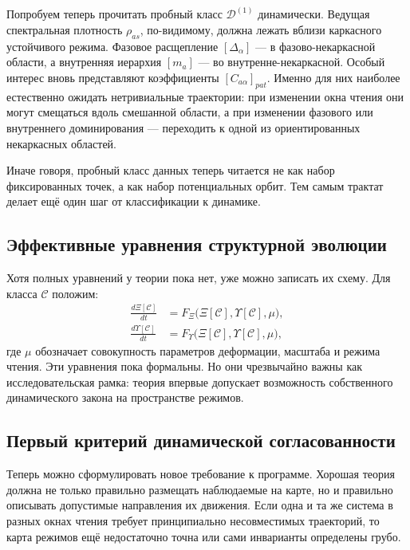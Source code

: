 \documentclass[12pt,a4paper]{article}
\begin{document}
Попробуем теперь прочитать пробный класс \(\mathcal{D}^{(1)}\) динамически. Ведущая спектральная плотность \(\rho_{as}\), по-видимому, должна лежать вблизи каркасного устойчивого режима. Фазовое расщепление \([\Delta_{\alpha}]\) --- в фазово-некаркасной области, а внутренняя иерархия \([m_a]\) --- во внутренне-некаркасной. Особый интерес вновь представляют коэффициенты \([C_{a\alpha}]_{pat}\). Именно для них наиболее естественно ожидать нетривиальные траектории: при изменении окна чтения они могут смещаться вдоль смешанной области, а при изменении фазового или внутреннего доминирования --- переходить к одной из ориентированных некаркасных областей.

Иначе говоря, пробный класс данных теперь читается не как набор фиксированных точек, а как набор потенциальных орбит. Тем самым трактат делает ещё один шаг от классификации к динамике.

\subsection{Эффективные уравнения структурной эволюции}

Хотя полных уравнений у теории пока нет, уже можно записать их схему. Для класса \(\mathcal{C}\) положим:
\begin{align}
\frac{d\Xi[\mathcal{C}]}{dt} &= F_{\Xi}\big(\Xi[\mathcal{C}],\Upsilon[\mathcal{C}],\mu\big), \\
\frac{d\Upsilon[\mathcal{C}]}{dt} &= F_{\Upsilon}\big(\Xi[\mathcal{C}],\Upsilon[\mathcal{C}],\mu\big),
\end{align}
где \(\mu\) обозначает совокупность параметров деформации, масштаба и режима чтения. Эти уравнения пока формальны. Но они чрезвычайно важны как исследовательская рамка: теория впервые допускает возможность собственного динамического закона на пространстве режимов.

\subsection{Первый критерий динамической согласованности}

Теперь можно сформулировать новое требование к программе. Хорошая теория должна не только правильно размещать наблюдаемые на карте, но и правильно описывать допустимые направления их движения. Если одна и та же система в разных окнах чтения требует принципиально несовместимых траекторий, то карта режимов ещё недостаточно точна или сами инварианты определены грубо.
\end{document}
